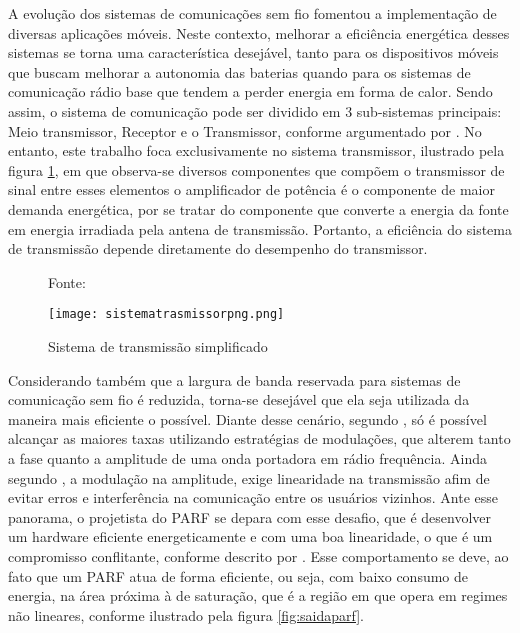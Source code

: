 A evolução dos sistemas de comunicações sem fio fomentou a implementação de diversas aplicações móveis. Neste contexto, melhorar a eficiência energética desses sistemas se torna uma característica desejável, tanto para os dispositivos móveis que buscam melhorar a autonomia das baterias quando para os sistemas de comunicação rádio base que tendem a perder energia em forma de calor.  
Sendo assim, o sistema de comunicação pode ser dividido em 3 sub-sistemas principais: Meio transmissor, Receptor e o Transmissor, conforme argumentado por \cite{Schuartz2017}.
No entanto, este trabalho foca exclusivamente no sistema transmissor, ilustrado pela figura \ref{fig:sistemadetrasmissao}, em que observa-se diversos componentes que compõem o transmissor de sinal entre esses elementos o amplificador de potência é o componente de maior demanda energética, por se tratar do componente que converte a energia da fonte em energia irradiada pela antena de transmissão. Portanto, a eficiência do sistema de transmissão depende diretamente do desempenho do transmissor. 

\begin{figure}[!ht!]
    \centering
    \captionsetup{justification=centering}
    \caption*{Fonte: \cite{Schuartz2017}}
    \texttt{[image: sistematrasmissorpng.png]}
    \caption{Sistema de transmissão simplificado}
    \label{fig:sistemadetrasmissao}
\end{figure}

Considerando também que a largura de banda reservada para sistemas de comunicação sem fio é reduzida, torna-se desejável que ela seja utilizada da maneira mais eficiente o possível. Diante desse cenário, segundo \cite{Kenington2000}, só é possível alcançar as maiores taxas utilizando estratégias de modulações, que alterem tanto a fase quanto a amplitude de uma onda portadora em rádio frequência. Ainda segundo \cite{Kenington2000}, a modulação na amplitude, exige linearidade na transmissão afim de evitar erros e interferência na comunicação entre os usuários vizinhos. Ante esse panorama, o projetista do PARF se depara com esse desafio, que é desenvolver um hardware eficiente energeticamente e com uma boa linearidade, o que é um compromisso conflitante, conforme descrito por \cite{Cripps2006}. Esse comportamento se deve, ao fato que um PARF atua de forma eficiente, ou seja, com baixo consumo de energia, na área próxima à de saturação, que é a região em que opera em regimes não lineares, conforme ilustrado pela figura \ref{fig:saidaparf}.



